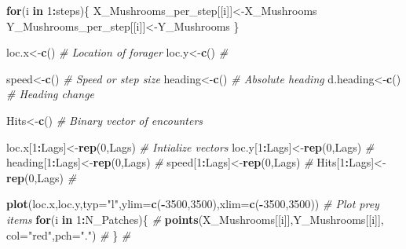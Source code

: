 \documentclass[
]{article}
\newenvironment{Shaded}{\begin{snugshade}}{\end{snugshade}}
\newcommand{\CommentTok}[1]{\textcolor[rgb]{0.56,0.35,0.01}{\textit{#1}}}
\newcommand{\ControlFlowTok}[1]{\textcolor[rgb]{0.13,0.29,0.53}{\textbf{#1}}}
\newcommand{\DataTypeTok}[1]{\textcolor[rgb]{0.13,0.29,0.53}{#1}}
\newcommand{\DecValTok}[1]{\textcolor[rgb]{0.00,0.00,0.81}{#1}}
\newcommand{\KeywordTok}[1]{\textcolor[rgb]{0.13,0.29,0.53}{\textbf{#1}}}
\newcommand{\NormalTok}[1]{#1}
\newcommand{\OperatorTok}[1]{\textcolor[rgb]{0.81,0.36,0.00}{\textbf{#1}}}
\newcommand{\StringTok}[1]{\textcolor[rgb]{0.31,0.60,0.02}{#1}}
\begin{document}
\begin{Shaded}
\begin{Highlighting}[]
\ControlFlowTok{for}\NormalTok{(i }\ControlFlowTok{in} \DecValTok{1}\OperatorTok{:}\NormalTok{steps)\{}
\NormalTok{ X_Mushrooms_per_step[[i]]<-X_Mushrooms}
\NormalTok{ Y_Mushrooms_per_step[[i]]<-Y_Mushrooms}
\NormalTok{\}}

\NormalTok{loc.x<-}\KeywordTok{c}\NormalTok{()                                                                      }\CommentTok{# Location of forager}
\NormalTok{loc.y<-}\KeywordTok{c}\NormalTok{()                                                                      }\CommentTok{#}

\NormalTok{speed<-}\KeywordTok{c}\NormalTok{()                                                                      }\CommentTok{# Speed or step size}
\NormalTok{heading<-}\KeywordTok{c}\NormalTok{()                                                                    }\CommentTok{# Absolute heading}
\NormalTok{d.heading<-}\KeywordTok{c}\NormalTok{()                                                                  }\CommentTok{# Heading change}

\NormalTok{Hits<-}\KeywordTok{c}\NormalTok{()                                                                       }\CommentTok{# Binary vector of encounters}

\NormalTok{loc.x[}\DecValTok{1}\OperatorTok{:}\NormalTok{Lags]<-}\KeywordTok{rep}\NormalTok{(}\DecValTok{0}\NormalTok{,Lags)                                                      }\CommentTok{# Intialize vectors}
\NormalTok{loc.y[}\DecValTok{1}\OperatorTok{:}\NormalTok{Lags]<-}\KeywordTok{rep}\NormalTok{(}\DecValTok{0}\NormalTok{,Lags)                                                      }\CommentTok{#}
\NormalTok{heading[}\DecValTok{1}\OperatorTok{:}\NormalTok{Lags]<-}\KeywordTok{rep}\NormalTok{(}\DecValTok{0}\NormalTok{,Lags)                                                    }\CommentTok{#}
\NormalTok{speed[}\DecValTok{1}\OperatorTok{:}\NormalTok{Lags]<-}\KeywordTok{rep}\NormalTok{(}\DecValTok{0}\NormalTok{,Lags)                                                      }\CommentTok{#}
\NormalTok{Hits[}\DecValTok{1}\OperatorTok{:}\NormalTok{Lags]<-}\KeywordTok{rep}\NormalTok{(}\DecValTok{0}\NormalTok{,Lags)                                                       }\CommentTok{#}

\KeywordTok{plot}\NormalTok{(loc.x,loc.y,}\DataTypeTok{typ=}\StringTok{"l"}\NormalTok{,}\DataTypeTok{ylim=}\KeywordTok{c}\NormalTok{(}\OperatorTok{-}\DecValTok{3500}\NormalTok{,}\DecValTok{3500}\NormalTok{),}\DataTypeTok{xlim=}\KeywordTok{c}\NormalTok{(}\OperatorTok{-}\DecValTok{3500}\NormalTok{,}\DecValTok{3500}\NormalTok{))                 }\CommentTok{# Plot prey items}
 \ControlFlowTok{for}\NormalTok{(i }\ControlFlowTok{in} \DecValTok{1}\OperatorTok{:}\NormalTok{N_Patches)\{                                                         }\CommentTok{#}
  \KeywordTok{points}\NormalTok{(X_Mushrooms[[i]],Y_Mushrooms[[i]], }\DataTypeTok{col=}\StringTok{"red"}\NormalTok{,}\DataTypeTok{pch=}\StringTok{"."}\NormalTok{)                  }\CommentTok{#}
\NormalTok{   \}                                                                            }\CommentTok{#}


\end{Highlighting}
\end{Shaded}
\end{document}
